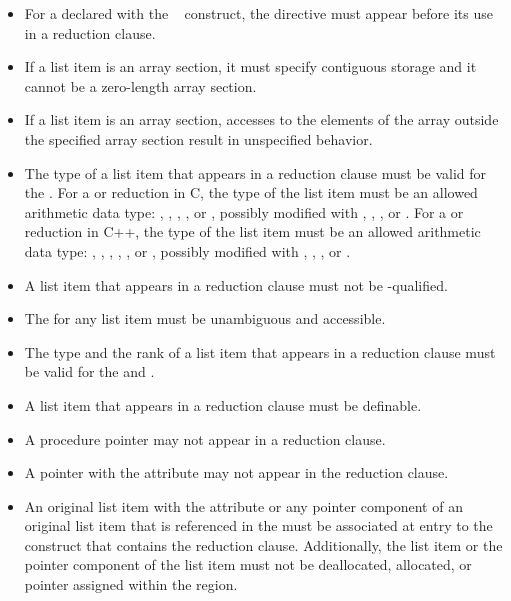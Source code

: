 {{{{\begin{itemize}
\item For a  declared with the ~
construct, the directive must appear before its use in a reduction clause.

\item If a list item is an array section, it must specify contiguous storage
and it cannot be a zero-length array section.

\item If a list item is an array section, accesses to the elements of the array
outside the specified array section result in unspecified behavior.

\ccppspecificstart
\item The type of a list item that appears in a reduction clause must be valid for the 
. For a  or  reduction in C, the type of the list item must 
be an allowed arithmetic data type: , , , , or , 
possibly modified with , , , or . For a  or  
reduction in C++, the type of the list item must be an allowed arithmetic data type: 
, , , , , or , possibly modified with , 
, , or .

\item A list item that appears in a reduction clause must not be -qualified.

\item The  for any list item must be unambiguous and accessible.
\ccppspecificend
\bigskip

\fortranspecificstart
\item The type and the rank of a list item that appears in a reduction clause
must be valid for the  and .

\item A list item that appears in a reduction clause must be definable.

\item A procedure pointer may not appear in a reduction clause.

\item A pointer with the  attribute may not appear in the
reduction clause.

\item An original list item with the  attribute or any pointer
component of an original list item that is referenced in the 
must be associated at entry to the construct that contains the reduction
clause. Additionally, the list item or the pointer component of the list item
must not be deallocated, allocated, or pointer assigned within the region.


\end{itemize}}}}}
